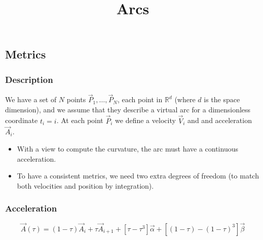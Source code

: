 \documentclass[aps,12pt]{revtex4}
\begin{document}
\title{Arcs}
\maketitle
	

\subsection{Metrics}

\subsubsection{Description}
We have a set of $N$ points $\vec{P}_1,\ldots,\vec{P}_N$, each point in $\mathbb{R}^d$ (where $d$ is the space dimension), and we assume
that they describe a virtual arc for a dimensionless coordinate $t_i=i$.
At each point $\vec{P}_i$ we define a velocity $\vec{V}_i$ and and acceleration $\vec{A}_i$.
\begin{itemize}
\item With a view to compute the curvature, the arc must have a continuous acceleration.
\item To have a consistent metrics, we need two extra degrees of freedom (to match both velocities and position by integration).
\end{itemize}

\subsubsection{Acceleration}

\begin{equation}
	\vec{A}(\tau) = (1-\tau)\vec{A}_i + \tau  \vec{A}_{i+1} + \left[ \tau - \tau^3 \right] \vec{\alpha} + \left[ (1-\tau) - (1-\tau)^3 \right] \vec{\beta}
\end{equation}
\end{document}
